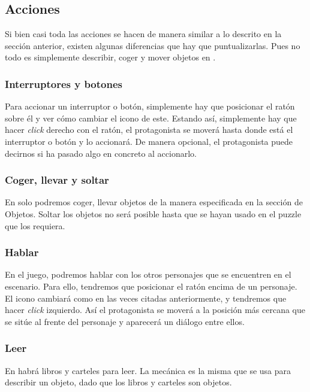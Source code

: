         \subsection{Acciones}
        Si bien casi toda las acciones se hacen de manera similar a lo descrito en la sección anterior, existen algunas diferencias que hay que puntualizarlas. Pues no todo es simplemente describir, coger y mover objetos en \nombrejuego.
        
            \subsubsection{Interruptores y botones}
            Para accionar un interruptor o botón, simplemente hay que posicionar el ratón sobre él y ver cómo cambiar el icono de este. Estando así, simplemente hay que hacer \emph{click} derecho con el ratón, el protagonista se moverá hasta donde está el interruptor o botón y lo accionará. De manera opcional, el protagonista puede decirnos si ha pasado algo en concreto al accionarlo.
            
            \subsubsection{Coger, llevar y soltar}
            En \nombrejuego solo podremos coger, llevar objetos de la manera especificada en la sección de Objetos. Soltar los objetos no será posible hasta que se hayan usado en el puzzle que los requiera.
            
            \subsubsection{Hablar}
            En el juego, podremos hablar con los otros personajes que se encuentren en el escenario. Para ello, tendremos que posicionar el ratón encima de un personaje. El icono cambiará como en las veces citadas anteriormente, y tendremos que hacer \emph{click} izquierdo. Así el protagonista se moverá a la posición más cercana que se sitúe al frente del personaje y aparecerá un diálogo entre ellos.
            
            \subsubsection{Leer}
            En \nombrejuego habrá libros y carteles para leer. La mecánica es la misma que se usa para describir un objeto, dado que los libros y carteles son objetos. 
         
